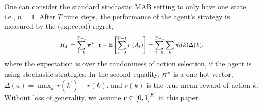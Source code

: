 One can consider the standard stochastic MAB setting to only have one state, i.e., $n=1$.  
After $T$ time steps, the performance of the agent's strategy is measured by the (expected) regret,
\begin{equation}
\label{eq:expected_regret}
\scalemath{0.85}{
R_T = \sum\limits_{t=0}^{T-1}{{\rvpi^*}^\top \rvr} - \sE \left[ \sum\limits_{t=0}^{T-1}{  r\left(A_t\right)  } \right] = \sum_{t=0}^{T-1} \sum_k \pi_t(k) \Delta(k).
}
\end{equation}
where the expectation is over the randomness of action selection, if the agent is using stochastic strategies. In the second equality, ${\boldsymbol{\pi}}^*$ is a one-hot vector, $\Delta(a) = \max_{k^\prime} r(k^\prime)- r(k)$, and  $r(k)$ is the true mean reward of action $k$.
Without loss of generality, we assume ${\mathbf{r}} \in \left[ 0, 1 \right]^K$ in this paper.


